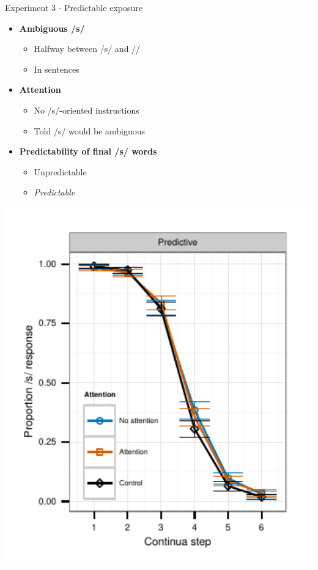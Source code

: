 \documentclass{beamer}
\begin{document}
\begin{frame}{Experiment 3 - Predictable exposure}

\begin{minipage}{0.4\textwidth}
\begin{itemize}
\item \textbf{Ambiguous /s/}
\begin{itemize}
\item Halfway between /s/ and /\textesh/
\item In sentences
\end{itemize}

\item \textbf{Attention}
\begin{itemize}
\item No /s/-oriented instructions
\item Told /s/ would be ambiguous
\end{itemize}

\item \textbf{Predictability of final /s/ words}
\begin{itemize}
\item Unpredictable
\item \emph{Predictable}
\end{itemize}
\end{itemize}
\end{minipage}
\hfill
\begin{minipage}{0.53\textwidth}
\includegraphics[width=1.0\textwidth]{graphs/exp3_categresults_present2-predictable}
\end{minipage}

\end{frame}
\end{document}
